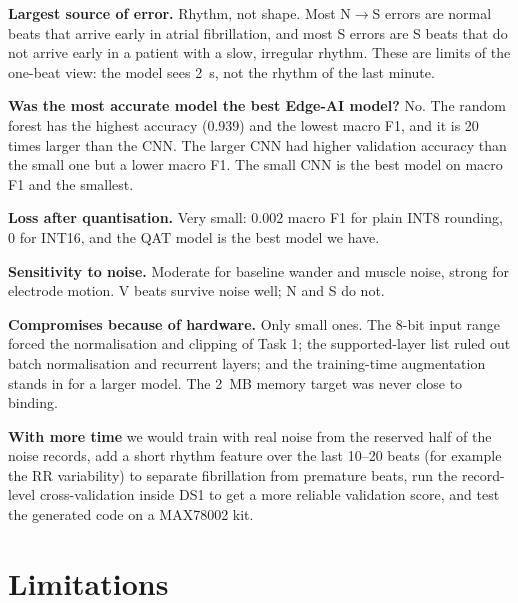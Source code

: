 \documentclass[11pt,a4paper]{article}
\begin{document}
\textbf{Largest source of error.} Rhythm, not shape. Most N$\to$S errors are normal beats that arrive early in atrial fibrillation, and most S errors are S beats that do not arrive early in a patient with a slow, irregular rhythm. These are limits of the one-beat view: the model sees 2~s, not the rhythm of the last minute.

\textbf{Was the most accurate model the best Edge-AI model?} No. The random forest has the highest accuracy (0.939) and the lowest macro F1, and it is 20 times larger than the CNN. The larger CNN had higher validation accuracy than the small one but a lower macro F1. The small CNN is the best model on macro F1 and the smallest.

\textbf{Loss after quantisation.} Very small: 0.002 macro F1 for plain INT8 rounding, 0 for INT16, and the QAT model is the best model we have.

\textbf{Sensitivity to noise.} Moderate for baseline wander and muscle noise, strong for electrode motion. V beats survive noise well; N and S do not.

\textbf{Compromises because of hardware.} Only small ones. The 8-bit input range forced the normalisation and clipping of Task 1; the supported-layer list ruled out batch normalisation and recurrent layers; and the training-time augmentation stands in for a larger model. The 2~MB memory target was never close to binding.

\textbf{With more time} we would train with real noise from the reserved half of the noise records, add a short rhythm feature over the last 10--20 beats (for example the RR variability) to separate fibrillation from premature beats, run the record-level cross-validation inside DS1 to get a more reliable validation score, and test the generated code on a MAX78002 kit.

\section{Limitations}
\end{document}
